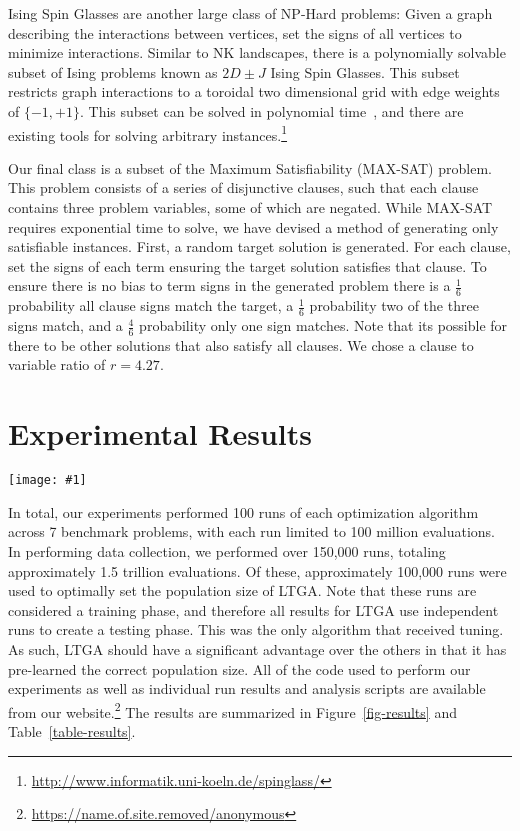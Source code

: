 \documentclass{sig-alternate}
\newcommand{\includegraphicswide}[1]
{\texttt{[image: \#1]}}
\begin{document}
Ising Spin Glasses are another large class of NP-Hard problems: Given a graph
describing the interactions between vertices, set the signs of all vertices to minimize
interactions.
Similar to NK landscapes, there is a polynomially solvable subset of Ising problems
known as $2D\pm J$ Ising Spin Glasses.  This subset restricts graph interactions to a
toroidal two dimensional grid with edge weights of $\{-1, +1\}$.  This subset can
be solved in polynomial time~\cite{saul:1994:spinglass}, and there are existing
tools for solving arbitrary instances.\footnote{\url{http://www.informatik.uni-koeln.de/spinglass/}}

Our final class is a subset of the Maximum Satisfiability (MAX-SAT) problem.
This problem consists of a series of disjunctive clauses, such that each clause contains
three problem variables, some of which are negated. While
MAX-SAT requires exponential time to solve, we have devised a method of generating
only satisfiable instances.
First, a random target solution is generated.  For each clause, set the signs of each
term ensuring the target solution satisfies that clause.
To ensure there is no bias to term signs in the generated problem there is a $\frac{1}{6}$ probability
all clause signs match the target, a $\frac{1}{6}$ probability two of the three signs match,
and a $\frac{4}{6}$ probability only one sign matches.  Note that its possible for there to be
other solutions that also satisfy all clauses.  We chose a clause to variable ratio
of $r=4.27$.

\section{Experimental Results}
\begin{figure*}
  \centering
  \includegraphicswide{WithRast}
  \caption{Comparison of the median number of evaluations to reach the global optimum for
           the four different optimization methods with respect
           to problem size.  If the median run did not reach the global optimum no point
           is drawn.  Results given on a log-log scale.}
  \label{fig-results}
\end{figure*}

In total, our experiments performed 100 runs of each optimization algorithm across
7 benchmark problems, with each run limited to 100 million evaluations.
In performing data collection, we performed over 150,000 runs, totaling approximately
1.5 trillion evaluations.  Of these, approximately 100,000 runs were used to optimally
set the population size of LTGA.  Note that these runs are considered a training phase,
and therefore all results for LTGA use independent runs to create a testing phase.
This was the only algorithm that received tuning.  As such, LTGA should have a significant
advantage over the others in that it has pre-learned the correct population size.
All of the code used to perform our experiments
as well as individual run results and analysis scripts are available from our
website.\footnote{\url{https://name.of.site.removed/anonymous}}  The results
are summarized in Figure~\ref{fig-results} and Table~\ref{table-results}.
\end{document}
